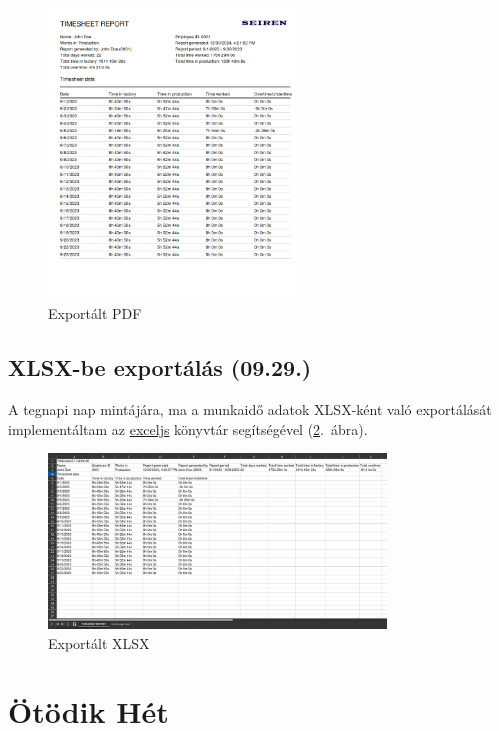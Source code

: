 \documentclass[a4paper]{article}
\begin{document}
\begin{figure}[ht]
  \centering
  \includegraphics[width = 0.6\textwidth]{images/report_pdf.png}
  \caption{Exportált PDF}
  \label{fig:report_pdf}
\end{figure}

\subsection{XLSX-be exportálás (09.29.)}

A tegnapi nap mintájára, ma a munkaidő adatok XLSX-ként való exportálását implementáltam az
\href{https://www.npmjs.com/package/exceljs}{exceljs} könyvtár segítségével (\ref{fig:report_xlsx}.~ábra).

\begin{figure}[ht]
  \centering
  \includegraphics[width = 0.8\textwidth]{images/report_xlsx.png}
  \caption{Exportált XLSX}
  \label{fig:report_xlsx}
\end{figure}

\section{Ötödik Hét}
\end{document}
